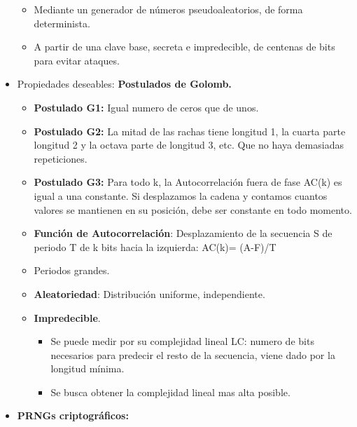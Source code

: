 \documentclass[12pt, twoside, openright]{report} %
\begin{document}
\begin{itemize}
    \begin{itemize}
    \item Mediante un generador de números pseudoaleatorios, de forma
      determinista.
      
    \item A partir de una clave base, secreta e impredecible, de centenas de
      bits para evitar ataques.
      
    \end{itemize}
  \item Propiedades deseables: \textbf{Postulados de Golomb.}
    

    \begin{itemize}
    \item \textbf{Postulado G1:} Igual numero de ceros que de unos.
      
    \item \textbf{Postulado G2:} La mitad de las rachas tiene longitud 1, la
      cuarta parte longitud 2 y la octava parte de longitud 3, etc. Que
      no haya demasiadas repeticiones.
      
    \item \textbf{Postulado G3:} Para todo k, la Autocorrelación fuera de
      fase AC(k) es igual a una constante. Si desplazamos la cadena y
      contamos cuantos valores se mantienen en su posición, debe ser
      constante en todo momento.
      
    \item \textbf{Función de Autocorrelación}: Desplazamiento de la
      secuencia S de periodo T de k bits hacia la izquierda: AC(k)=
      (A-F)/T
      
    \item Periodos grandes.
      
    \item \textbf{Aleatoriedad}: Distribución uniforme, independiente.
      
    \item \textbf{Impredecible}.
      

      \begin{itemize}
      \item Se puede medir por su complejidad lineal LC: numero de bits
        necesarios para predecir el resto de la secuencia, viene dado
        por la longitud mínima.
        
      \item Se busca obtener la complejidad lineal mas alta posible.
        
      \end{itemize}
    \end{itemize}
  \item \textbf{PRNGs criptográficos:}
    


\end{itemize}
\end{document}
